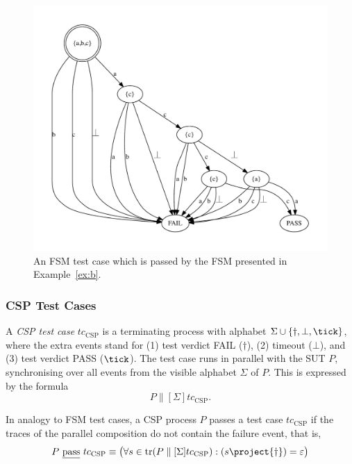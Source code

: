  \begin{figure}
 \begin{center}
\includegraphics[width=.8\textwidth]{fsm0tc.pdf}
\end{center}
\caption{An FSM test case which is passed by the FSM presented in Example~\ref{ex:b}.}
 \label{fig:fsm0tc}
 \end{figure}

 


\subsubsection*{CSP Test Cases}
A \emph{CSP test case} $tc_\text{CSP}$  is a terminating process with alphabet 
$\Sigma\cup\{\dag,\bot,\tick \}$, where the extra events stand for 
(1) test  verdict FAIL ($\dag$), (2) timeout ($\bot$), and (3) test 
 verdict PASS ($\tick$). The test case runs in parallel with the SUT $P$,
 synchronising over all events from the visible alphabet $\Sigma$ of $P$. This is 
 expressed by the formula
 $$
 P\parallel[\Sigma] tc_\text{CSP}.
 $$
 
 In analogy to FSM test cases, a CSP process $P$ passes a test case $tc_\text{CSP}$
 if the traces of the parallel composition do not contain the failure event, that is,
 $$
 P\ \pass\ tc_\text{CSP} \equiv \big(
 \forall s\in\trc(P\parallel[\Sigma] tc_\text{CSP}): (s\project \{\dag\}) = \varepsilon
 \big)
 $$

